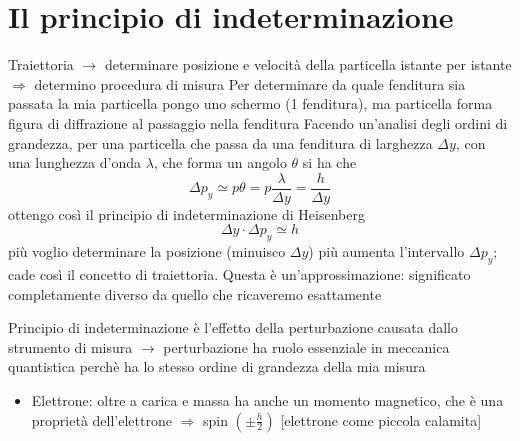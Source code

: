 \chapter{Il principio di indeterminazione}
Traiettoria $\rightarrow$ determinare posizione e velocità della particella istante per istante $\Rightarrow$ determino procedura di misura \newline
Per determinare da quale fenditura sia passata la mia particella pongo uno schermo (1 fenditura), ma particella forma figura di diffrazione al passaggio nella fenditura \newline
Facendo un'analisi degli ordini di grandezza, per una particella che passa da una fenditura di larghezza $\Delta y$, con una lunghezza d'onda $\lambda$, che forma un angolo $\theta$ si ha che
\begin{equation*}
    \Delta p_y \simeq p\theta = p \frac{\lambda}{\Delta y} = \frac{h}{\Delta y}
\end{equation*}
ottengo così il principio di indeterminazione di Heisenberg
\begin{equation}
    \Delta y \cdot \Delta p_y \simeq h
\end{equation}
più voglio determinare la posizione (minuisco $\Delta y$) più aumenta l'intervallo $\Delta p_y$; cade così il concetto di traiettoria. \newline
Questa è un'approssimazione: significato completamente diverso da quello che ricaveremo esattamente \newline

\noindent Principio di indeterminazione è l'effetto della perturbazione causata dallo strumento di misura $\rightarrow$ perturbazione ha ruolo essenziale in meccanica quantistica perchè ha lo stesso ordine di grandezza della mia misura
\begin{itemize}
    \item Elettrone: oltre a carica e massa ha anche un momento magnetico, che è una proprietà dell'elettrone $\Rightarrow$ spin $\left(\pm \frac{h}{2}\right)$ [elettrone come piccola calamita]
\end{itemize}